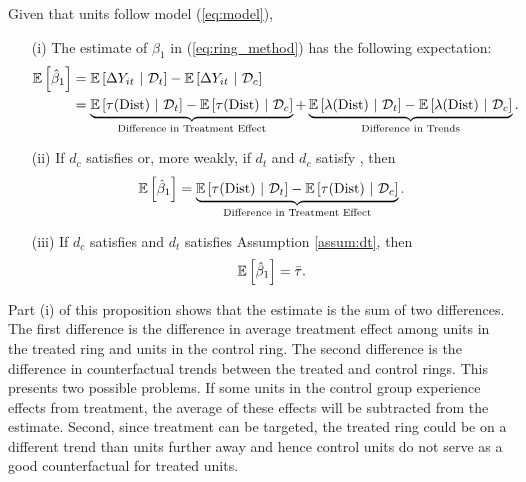 \documentclass[12pt]{article}
\newcommand{\dist}{\text{Dist}}
\begin{document}
\begin{proposition}\label{prop:ring_decomp}  
    Given that units follow model (\ref{eq:model}),
    \begin{enumerate}
        \item[(i)] The estimate of $\beta_1$ in (\ref{eq:ring_method}) has the following expectation:
        \begin{align*}
            \expec{\hat{\beta}_1} &= \condexpec{\Delta Y_{it}}{\mathcal{D}_t} - \condexpec{\Delta Y_{it}}{\mathcal{D}_c} \\
            &=  \underbrace{\condexpec{\tau(\dist)}{\mathcal{D}_t} - \condexpec{\tau(\dist)}{\mathcal{D}_c} }_{\text{Difference in Treatment Effect}} + \underbrace{\condexpec{\lambda(\dist)}{\mathcal{D}_t} - \condexpec{\lambda(\dist)}{\mathcal{D}_c} }_{\text{Difference in Trends}}.
        \end{align*}
        
        \item[(ii)] If $d_c$ satisfies  or, more weakly, if $d_t$ and $d_c$ satisfy , then
        \[ 
            \expec{\hat{\beta}_1} = 
            \underbrace{\condexpec{\tau(\dist)}{\mathcal{D}_t} - \condexpec{\tau(\dist)}{\mathcal{D}_c} }_{\text{Difference in Treatment Effect}}.
        \] 
    
        \item[(iii)] If $d_c$ satisfies  and $d_t$ satisfies Assumption \ref{assum:dt}, then
        \[ 
            \mathbb{E}\left[\hat{\beta}_1\right] = \bar{\tau}.
        \]
    \end{enumerate}
\end{proposition}

Part (i) of this proposition shows that the estimate is the sum of two differences. The first difference is the difference in average treatment effect among units in the treated ring and units in the control ring. The second difference is the difference in counterfactual trends between the treated and control rings. This presents two possible problems. If some units in the control group experience effects from treatment, the average of these effects will be subtracted from the estimate. Second, since treatment can be targeted, the treated ring could be on a different trend than units further away and hence control units do not serve as a good counterfactual for treated units.
\end{document}
